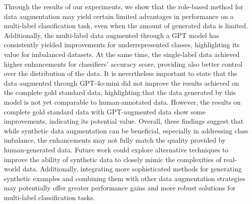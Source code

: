 \documentclass[manuscript]{clv3}
\begin{document}
Through the results of our experiments, we show that the role-based method for data augmentation may yield certain limited advantages in performance on a multi-label classification task, even when the amount of generated data is limited. Additionally, the multi-label data augmented through a GPT model has consistently yielded improvements for underrepresented classes, highlighting its value for imbalanced datasets. At the same time, the single-label data achieved higher enhancements for classifiers' accuracy score, providing also better control over the distribution of the data. It is nevertheless important to state that the data augmented through GPT-4o-mini did not improve the results achieved on the complete gold standard data, highlighting that the data generated by this model is not yet comparable to human-annotated data. However, the results on complete gold standard data with GPT-augmented data show some improvements, indicating its potential value. Overall, these findings suggest that while synthetic data augmentation can be beneficial, especially in addressing class imbalance, the enhancements may not fully match the quality provided by human-generated data. Future work could explore alternative techniques to improve the ability of synthetic data to closely mimic the complexities of real-world data. Additionally, integrating more sophisticated methods for generating synthetic examples and combining them with other data augmentation strategies may potentially offer greater performance gains and more robust solutions for multi-label classification tasks. 
\end{document}
